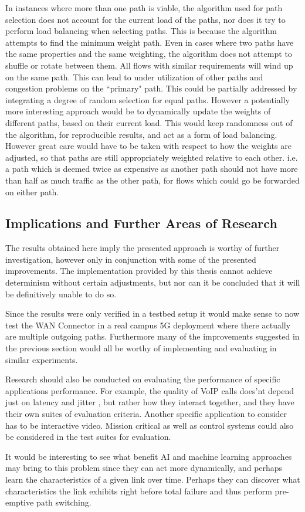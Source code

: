 In instances where more than one path is viable, the algorithm used for path selection does not account for the current load of the paths, nor does it try to perform load balancing when selecting paths. This is because the algorithm attempts to find the minimum weight path. Even in cases where two paths have the same properties and the same weighting, the algorithm does not attempt to shuffle or rotate between them. All flows with similar requirements will wind up on the same path. This can lead to under utilization of other paths and congestion problems on the “primary" path. This could be partially addressed by integrating a degree of random selection for equal paths. However a potentially more interesting approach would be to dynamically update the weights of different paths, based on their current load. This would keep randomness out of the algorithm, for reproducible results, and act as a form of load balancing. However great care would have to be taken with respect to how the weights are adjusted, so that paths are still appropriately weighted relative to each other. i.e. a path which is deemed twice as expensive as another path should not have more than half as much traffic as the other path, for flows which could go be forwarded on either path.


\subsection{Implications and Further Areas of Research}

The results obtained here imply the presented approach is worthy of further investigation, however only in conjunction with some of the presented improvements. The implementation provided by this thesis cannot achieve determinism without certain adjustments, but nor can it be concluded that it will be definitively unable to do so.

Since the results were only verified in a testbed setup it would make sense to now test the WAN Connector in a real campus 5G deployment where there actually are multiple outgoing paths. Furthermore many of the improvements suggested in the previous section would all be worthy of implementing and evaluating in similar experiments.

Research should also be conducted on evaluating the performance of specific applications performance. For example, the quality of VoIP calls does'nt depend just on latency and jitter \cite{tao2005improving}, but rather how they interact together, and they have their own suites of evaluation criteria. Another specific application to consider has to be interactive video. Mission critical as well as control systems could also be considered in the test suites for evaluation.

It would be interesting to see what benefit AI and machine learning approaches may bring to this problem since they can act more dynamically, and perhaps learn the characteristics of a given link over time. Perhaps they can discover what characteristics the link exhibits right before total failure and thus perform pre-emptive path switching.
